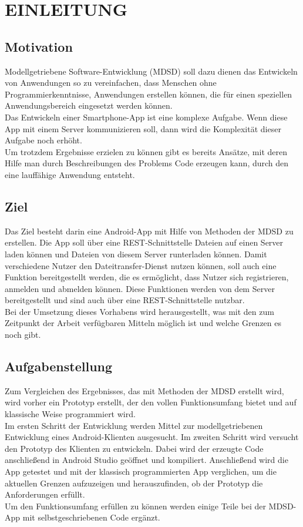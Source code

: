 \section{\uppercase{Einleitung}}
	\label{sec:introduction}
	
	\subsection{Motivation}
	Modellgetriebene Software-Entwicklung (MDSD) soll dazu dienen das Entwickeln von Anwendungen so zu vereinfachen, dass Menschen ohne Programmierkenntnisse, Anwendungen erstellen k\"onnen, die f\"ur einen speziellen Anwendungsbereich eingesetzt werden k\"onnen.\\
	Das Entwickeln einer Smartphone-App ist eine komplexe Aufgabe. Wenn diese App mit einem Server kommunizieren soll, dann wird die Komplexit\"at dieser Aufgabe noch erh\"oht.\\
	Um trotzdem Ergebnisse erzielen zu k\"onnen gibt es bereits Ans\"atze, mit deren Hilfe man durch Beschreibungen des Problems Code erzeugen kann, durch den eine lauff\"ahige Anwendung entsteht. 
	
	\subsection{Ziel}
	Das Ziel besteht darin eine Android-App mit Hilfe von Methoden der MDSD zu erstellen. Die App soll \"uber eine REST-Schnittstelle Dateien auf einen Server laden k\"onnen und Dateien von diesem Server runterladen k\"onnen. Damit verschiedene Nutzer den Dateitransfer-Dienst nutzen k\"onnen, soll auch eine Funktion bereitgestellt werden, die es erm\"oglicht, dass Nutzer sich registrieren, anmelden und abmelden k\"onnen. Diese Funktionen werden von dem Server bereitgestellt und sind auch \"uber eine REST-Schnittstelle nutzbar.\\
	Bei der Umsetzung dieses Vorhabens wird herausgestellt, was mit den zum Zeitpunkt der Arbeit verf\"ugbaren Mitteln m\"oglich ist und welche Grenzen es noch gibt.
	
	\subsection{Aufgabenstellung}
	Zum Vergleichen des Ergebnisses, das mit Methoden der MDSD erstellt wird, wird vorher ein Prototyp erstellt, der den vollen Funktionsumfang bietet und auf klassische Weise programmiert wird.\\
	Im ersten Schritt der Entwicklung werden Mittel zur modellgetriebenen Entwicklung eines Android-Klienten ausgesucht. Im zweiten Schritt wird versucht den Prototyp des Klienten zu entwickeln. Dabei wird der erzeugte Code anschlie\ss{}end in Android Studio ge\"offnet und kompiliert. Anschlie\ss{}end wird die App getestet und mit der klassisch programmierten App verglichen, um die aktuellen Grenzen aufzuzeigen und herauszufinden, ob der Prototyp die Anforderungen erf\"ullt.\\
	Um den Funktionsumfang erf\"ullen zu k\"onnen werden einige Teile bei der MDSD-App mit selbstgeschriebenen Code erg\"anzt.
	
